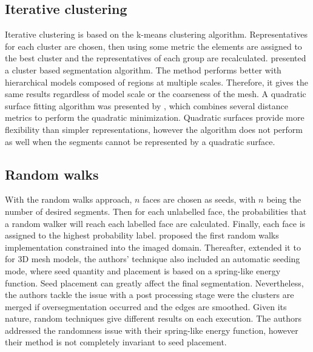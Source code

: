 

\subsection{Iterative clustering}

Iterative clustering is based on the k-means clustering algorithm.
Representatives for each cluster are chosen, then using some metric the elements are assigned to the best cluster and the representatives of each group are recalculated.
\cite{Lai2006} presented a cluster based segmentation algorithm.
The method performs better with hierarchical models composed of regions at multiple scales.
Therefore, it gives the same results regardless of model scale or the coarseness of the mesh.
A quadratic surface fitting algorithm was presented by \cite{Yan2012}, which combines several distance metrics to perform the quadratic minimization.
Quadratic surfaces provide more flexibility than simpler representations, however the algorithm does not perform as well when the segments 
cannot be represented by a quadratic surface.



\subsection{Random walks}

With the random walks approach, $n$ faces are chosen as seeds, with $n$ being the number of desired segments.
Then for each unlabelled face, the probabilities that a random walker will reach each labelled face are calculated.
Finally, each face is assigned to the highest probability label.
\cite{Grady2006} proposed the first random walks implementation constrained into the imaged domain.
Thereafter, \cite{Lai2009} extended it to for 3D mesh models, the authors' technique also included an automatic seeding mode, where seed quantity and placement is based on a spring-like energy function.
Seed placement can greatly affect the final segmentation.
Nevertheless, the authors tackle the issue with a post processing stage were the clusters are merged if oversegmentation occurred and the edges are smoothed.
Given its nature, random techniques give different results on each execution. 
The authors addressed the randomness issue with their spring-like energy function, however their method is not completely invariant to seed placement.
 

